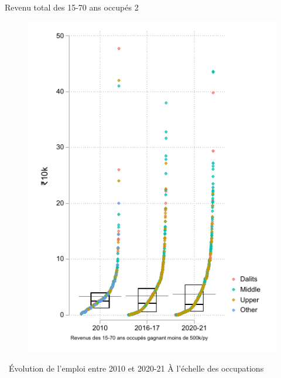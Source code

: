 \documentclass[aspectratio=169]{beamer}
\begin{document}
\begin{frame}[plain, shrink=2]{Revenu total des 15-70 ans occupés 2}
\begin{figure}[htpb]
\centering
\includegraphics[scale=0.9]{INPUT/inc_indiv500k.pdf}
\end{figure}
\end{frame}




\begin{frame}{\faCommentsO ~Évolution de l'emploi entre 2010 et 2020-21}
    \centering
    {\fontsize{20}{30}\selectfont À l'échelle des occupations}
\end{frame}
\end{document}
